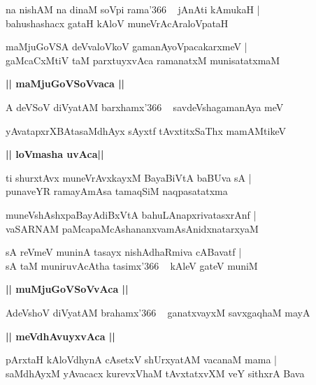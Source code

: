 \documentclass[twoside,12pt,openright]{book}
\newcounter{shloka}[chapter]
\def\uvaca#1{\centerline{{\large\textbf{#1}}}}
\begin{document}
\begin{shloka}%
na nishAM na dinaM soVpi rama\char'366 ~ jAnAti kAmukaH |\\
bahushashacx gataH kAloV muneVrAcAraloVpataH
\end{shloka}

\begin{shloka}%
maMjuGoVSA deVvaloVkoV gamanAyoVpacakarxmeV |\\
gaMcaCxMtiV taM parxtuyxvAca ramanatxM munisatatxmaM
\end{shloka}

\uvaca{|| maMjuGoVSoVvaca ||}

\begin{shloka}%
A deVSoV diVyatAM barxhamx\char'366 ~ savdeVshagamanAya meV 
\end{shloka}

\begin{shloka}%
yAvatapxrXBAtasaMdhAyx sAyxtf tAvxtitxSaThx mamAMtikeV
\end{shloka}

\uvaca{|| loVmasha uvAca||}

\begin{shloka}%
ti shurxtAvx muneVrAvxkayxM BayaBiVtA baBUva sA |\\
punaveYR ramayAmAsa tamaqSiM naqpasatatxma
\end{shloka}

\begin{shloka}%
muneVshAshxpaBayAdiBxVtA bahuLAnapxrivatasxrAnf |\\
vaSARNAM paMcapaMcAshananxvamAsAnidxnatarxyaM 
\end{shloka}

\begin{shloka}%
sA reVmeV muninA tasayx nishAdhaRmiva cABavatf |\\
sA taM muniruvAcAtha tasimx\char'366 ~ kAleV gateV muniM 
\end{shloka}

\uvaca{|| muMjuGoVSoVvAca ||}

\begin{shloka}%
AdeVshoV diVyatAM brahamx\char'366 ~ ganatxvayxM savxgaqhaM mayA 
\end{shloka}

\uvaca{|| meVdhAvuyxvAca ||}

\begin{shloka}%
pArxtaH kAloVdhynA cAsetxV shUrxyatAM vacanaM mama |\\
saMdhAyxM yAvacacx kurevxVhaM tAvxtatxvXM veY sithxrA Bava 
\end{shloka}
\end{document}
